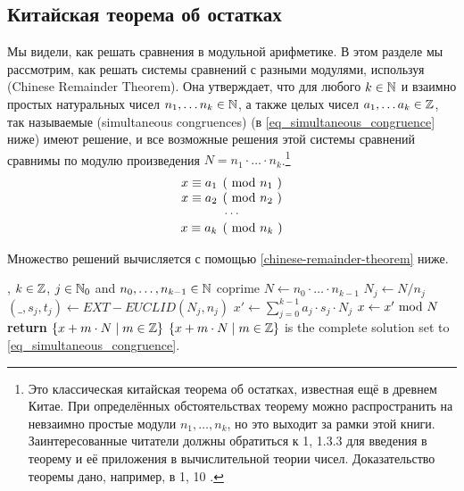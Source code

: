 \subsection{Китайская теорема об остатках} Мы видели, как решать сравнения в модульной арифметике. В этом разделе мы рассмотрим, как решать системы сравнений с разными модулями, используя  (Chinese Remainder Theorem). Она утверждает, что для любого $ k \in \mathbb{N} $ и взаимно простых натуральных чисел $ n_1, \ldots n_k \in \mathbb{N} $, а также целых чисел $ a_1, \ldots a_k \in \mathbb{Z} $, так называемые  (simultaneous congruences) (в \ref{eq_simultaneous_congruence}
 ниже) имеют решение, и все возможные решения этой системы сравнений сравнимы по модулю
произведения $N= n_1 \cdot \ldots \cdot n_k $.\footnote{Это классическая китайская теорема об остатках, известная ещё в древнем Китае. При определённых обстоятельствах теорему можно распространить на невзаимно простые модули $ n_1, \ldots, n_k $, но это выходит за рамки этой книги. Заинтересованные читатели должны обратиться к \chaptname{} 1, \secname{} 1.3.3 \cite{cohen-2010} для введения в теорему и её приложения в вычислительной теории чисел. Доказательство теоремы дано, например, в \chaptname{} 1, \secname{} 10 \cite{mignotte-1992}.} 
\begin{equation}
\label{eq_simultaneous_congruence}
\begin{array}{c}
\kongru{x}{a_1}{n_1} \\
\kongru{x}{a_2}{n_2} \\
\cdots \\
\kongru{x}{a_k}{n_k} \\
\end{array}
\end{equation}

Множество решений вычисляется с помощью \algname{} \ref{chinese-remainder-theorem} ниже. 
\begin{algorithm}\caption{Китайская теорема об остатках}
\label{chinese-remainder-theorem}
\begin{algorithmic}[0]
\Require , $k\in \mathbb{Z}$, $j\in \mathbb{N}_0$ and $n_0,\ldots,n_{k-1} \in \mathbb{N}$ coprime
\State $N\gets n_0\cdot \ldots \cdot n_{k-1}$
\State $N_j\gets N/n_j$
\State $(\_,s_j,t_j)\gets EXT-EUCLID (N_j,n_j)$
\EndWhile
\State $x'\gets \sum_{j=0}^{k-1}a_j\cdot s_j\cdot N_j$
\State $x\gets x' \text{ mod } N$
\State \textbf{return} $\{x+ m\cdot N\;|\; m\in \mathbb{Z}\}$
\EndProcedure
\Ensure $\{x+ m\cdot N\;|\; m\in \mathbb{Z}\}$ is the complete solution set to \ref{eq_simultaneous_congruence}.
\end{algorithmic}
\end{algorithm}


